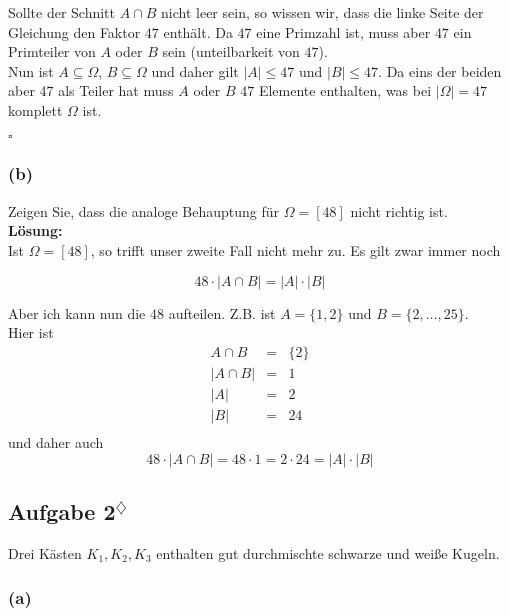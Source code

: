 \documentclass[11pt,a4paper,ngerman]{article}
\newcommand{\marcel}{$^\diamondsuit$}
\begin{document}
Sollte der Schnitt $A \cap B$ nicht leer sein, so wissen wir, dass die linke Seite der Gleichung den Faktor $47$ enthält. Da $47$ eine Primzahl ist, muss
aber $47$ ein Primteiler von $A$ oder $B$ sein (unteilbarkeit von $47$).\\

Nun ist $A \subseteq \Omega$, $B \subseteq \Omega$ und daher gilt $|A| \leq 47$ und $|B| \leq 47$. Da eins der beiden aber $47$ als Teiler hat muss $A$ oder $B$
$47$ Elemente enthalten, was bei $|\Omega| = 47$ komplett $\Omega$ ist.

\mbox{}\hfill$\square$

\subsubsection*{(b)}

Zeigen Sie, dass die analoge Behauptung für $\Omega = [48]$ nicht richtig ist.\\

\textbf{Lösung:}\\

Ist $\Omega = \left[ 48 \right]$, so trifft unser zweite Fall nicht mehr zu. Es gilt zwar immer noch

\[
    48 \cdot \left| A \cap B \right| = |A| \cdot |B|
\]

Aber ich kann nun die $48$ aufteilen. Z.B. ist $A = \{1,2\}$ und $B = \{2,\ldots,25\}$.\\

Hier ist
\[
    \begin{array}{rcl}
        A \cap B    &=& \{2\}\\
        |A \cap B| &=& 1\\
        |A|     &=& 2\\
        |B|     &=& 24\\
    \end{array}
\]
und daher auch
\[
    48 \cdot \left| A \cap B \right| = 48 \cdot 1 = 2 \cdot 24 = |A| \cdot |B|
\]

\subsection*{Aufgabe 2\marcel}

Drei Kästen $K_1,K_2,K_3$ enthalten gut durchmischte schwarze und weiße Kugeln.\\

\subsubsection*{(a)}
\end{document}
